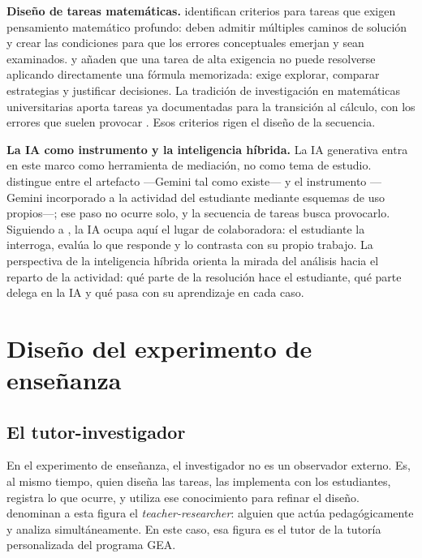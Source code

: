 \textbf{Diseño de tareas matemáticas.} \textcite{leungDesigningMathematicsTasks2015} identifican criterios para tareas que exigen pensamiento matemático profundo: deben admitir múltiples caminos de solución y crear las condiciones para que los errores conceptuales emerjan y sean examinados. \textcite{radmehrTheoreticalFrameworkTask2023} y \textcite{canogullariTaskDesignPrinciples2025} añaden que una tarea de alta exigencia no puede resolverse aplicando directamente una fórmula memorizada: exige explorar, comparar estrategias y justificar decisiones. La tradición de investigación en matemáticas universitarias aporta tareas ya documentadas para la transición al cálculo, con los errores que suelen provocar \parencite{vandebrouck2021task}. Esos criterios rigen el diseño de la secuencia.

\textbf{La IA como instrumento y la inteligencia híbrida.} La IA generativa entra en este marco como herramienta de mediación, no como tema de estudio. \textcite{trouche2004managing} distingue entre el artefacto ---Gemini tal como existe--- y el instrumento ---Gemini incorporado a la actividad del estudiante mediante esquemas de uso propios---; ese paso no ocurre solo, y la secuencia de tareas busca provocarlo. Siguiendo a \textcite{ouyang2021paradigms}, la IA ocupa aquí el lugar de colaboradora: el estudiante la interroga, evalúa lo que responde y lo contrasta con su propio trabajo. La perspectiva de la inteligencia híbrida \parencite{molenaar2022hybrid,font2022qedtutrix} orienta la mirada del análisis hacia el reparto de la actividad: qué parte de la resolución hace el estudiante, qué parte delega en la IA y qué pasa con su aprendizaje en cada caso.

\section{Diseño del experimento de enseñanza}

\subsection{El tutor-investigador}

En el experimento de enseñanza, el investigador no es un observador externo. Es, al mismo tiempo, quien diseña las tareas, las implementa con los estudiantes, registra lo que ocurre, y utiliza ese conocimiento para refinar el diseño. \textcite{steffe2000teaching} denominan a esta figura el \emph{teacher-researcher}: alguien que actúa pedagógicamente y analiza simultáneamente. En este caso, esa figura es el tutor de la tutoría personalizada del programa GEA.

